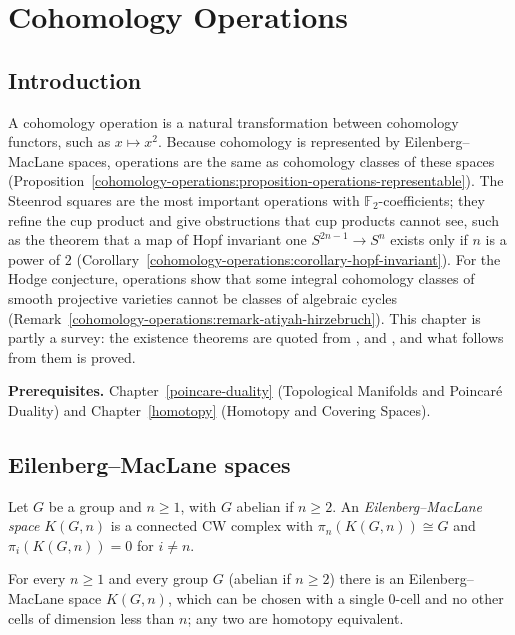 \chapter{Cohomology Operations}\label{cohomology-operations}

\section{Introduction}\label{cohomology-operations:section-introduction}

A cohomology operation is a natural transformation between cohomology functors, such as $x \mapsto x^2$. Because cohomology is
represented by Eilenberg--MacLane spaces, operations are the same as cohomology classes of these spaces
(Proposition~\ref{cohomology-operations:proposition-operations-representable}). The Steenrod squares are the most important
operations with $\mathbb{F}_2$-coefficients; they refine the cup product and give obstructions that cup products cannot see, such as
the theorem that a map of Hopf invariant one $S^{2n-1} \to S^n$ exists only if $n$ is a power of $2$
(Corollary~\ref{cohomology-operations:corollary-hopf-invariant}). For the Hodge conjecture, operations show that some integral
cohomology classes of smooth projective varieties cannot be classes of algebraic cycles
(Remark~\ref{cohomology-operations:remark-atiyah-hirzebruch}). This chapter is partly a survey: the existence theorems are quoted
from \cite{hatcher-at}, \cite{steenrod-epstein} and \cite{mosher-tangora}, and what follows from them is proved.

\noindent\textbf{Prerequisites.} Chapter~\ref{poincare-duality} (Topological Manifolds and Poincar\'e Duality) and Chapter~\ref{homotopy}
(Homotopy and Covering Spaces).

\section{Eilenberg--MacLane spaces}\label{cohomology-operations:section-eilenberg-maclane}

\begin{definition}\label{cohomology-operations:definition-eilenberg-maclane}
Let $G$ be a group and $n \geq 1$, with $G$ abelian if $n \geq 2$. An \emph{Eilenberg--MacLane space} $K(G, n)$ is a connected CW complex with $\pi_n(K(G, n)) \cong G$ and
$\pi_i(K(G, n)) = 0$ for $i \neq n$.
\end{definition}

\begin{theorem}\label{cohomology-operations:theorem-eilenberg-maclane-exist}
For every $n \geq 1$ and every group $G$ (abelian if $n \geq 2$) there is an Eilenberg--MacLane space $K(G, n)$, which can be chosen with a single $0$-cell and no other cells
of dimension less than $n$; any two are homotopy equivalent.
\end{theorem}

